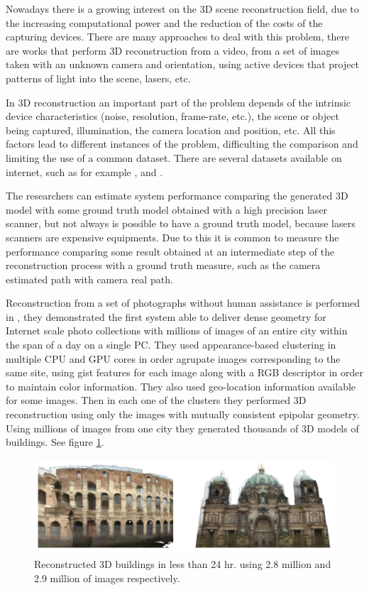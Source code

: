  
Nowadays there is a growing interest on the 3D scene reconstruction field, due to the increasing computational power and the reduction of 
the costs of the capturing devices. There are many approaches to deal with this problem, there are works that perform 3D reconstruction 
from a video, from a set of images taken with an unknown camera and orientation, using active devices that project patterns of light into 
the scene, lasers, etc. 

In 3D reconstruction an important part of the problem depends of the intrinsic 
device characteristics (noise, resolution, frame-rate, etc.), the scene or object being captured, illumination, the camera location and position, etc. All this 
factors lead to different instances of the problem, difficulting the comparison and limiting the use of a common dataset. There are several datasets 
available on internet, such as for example \cite{sturm12iros},  \cite{LaiBRF11} and \cite{ShottonGZICF13}.

The researchers can estimate system performance comparing the generated 3D model with some 
ground truth model obtained with a high precision laser scanner, but not always is possible to have a ground truth model, because lasers scanners 
are expensive equipments. Due to this it is common to measure the performance
 comparing some result obtained at an intermediate step of the reconstruction process with a ground truth measure, 
such as the camera estimated path with camera real path.   

Reconstruction from a set of photographs without human assistance is performed in \cite{jan}, they demonstrated the first system able to deliver dense geometry for Internet scale photo collections with millions of images of an entire city within the span of a day on a single PC. They used appearance-based clustering in multiple CPU and GPU cores 
in order agrupate images corresponding to the same site, using gist features for each image along with a RGB
descriptor in order to maintain color information. They also used geo-location information available for some  images. 
Then in each one of the clusters they performed 3D reconstruction using only the images with mutually consistent epipolar 
geometry. Using millions of images from one city they generated thousands of 3D models of buildings. See figure \ref{fig:jan}. 


\begin{figure}[h!]
\begin{center}
\includegraphics[scale=0.25]{images/jan}
\caption{Reconstructed 3D buildings in less than 24 hr. using 2.8 million and 2.9 million of images respectively.}
\label{fig:jan}
\end{center}
\end{figure}

